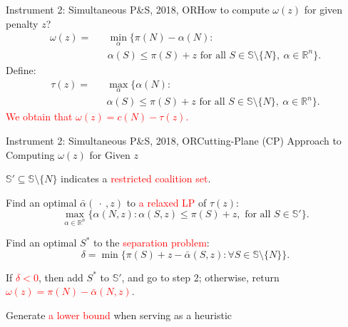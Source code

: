 \documentclass[14pt]{beamer}
\newcommand{\R}{\mathbb{R}}
\begin{document}
\begin{frame}{Instrument 2: Simultaneous P\&S, {\footnotesize 2018, OR}}{How to compute $\omega(z)$ for given penalty $z$?}
\vspace{-30pt}
\small
\begin{eqnarray*}
	\omega(z) = &&\min_{\alpha}\bigg\{ \pi(N) - \alpha(N):\\
	&& \alpha(S) \leq \pi(S)+z \mbox{ for all } S \in \mathbb{S} \setminus \{N\},~\alpha \in \R^n \bigg\}.
\end{eqnarray*}
Define:
\vspace{-10pt}
\begin{eqnarray*}
\tau(z) = && \max_{\alpha} \bigg\{ \alpha(N): \\
&& \alpha(S) \leq \pi(S)+z \mbox{ for all } S \in \mathbb{S} \setminus \{N\},~ \alpha \in \R^n \bigg\}.
\end{eqnarray*}
\textcolor{red}{We obtain that $\omega(z) = c(N)-\tau(z)$.}
\end{frame}



\begin{frame}{Instrument 2: Simultaneous P\&S, {\footnotesize 2018, OR}}{Cutting-Plane (CP) Approach to Computing $\omega(z)$ for Given $z$}
\small
{}
\begin{description}
\justifying
\item[Step 1.] $\mathbb{S}'\subseteq \mathbb{S}\setminus \{N\}$ indicates a \textcolor{red}{restricted coalition set}.
\item[Step 2.] Find an optimal $\bar{\alpha}(\ \cdot \ ,z)$ to \textcolor{red}{a relaxed LP} of $\tau(z)$:
\begin{equation*}
\max_{\alpha\in \R^n} \big\{ \alpha(N,z): \alpha(S,z) \leq \pi(S)+z, \mbox{ for all } S \in \mathbb{S}'\big\}.
\end{equation*} 
\vspace{-11pt}
\item[Step 3.]
Find an optimal $S^*$ to the \textcolor{red}{separation problem}:
\begin{equation*}
\delta = \min \big\{ \pi(S)+z-\bar{\alpha}(S,z): \forall S \in \mathbb{S} \setminus \{N\}\big\}.
\end{equation*}
\item[Step 4.]
If \textcolor{red}{$\delta<0$}, then add $S^*$ to $\mathbb{S}'$, and go to step 2; otherwise, return \textcolor{red}{$\omega(z)=\pi(N)-\bar{\alpha}(N,z)$}. %
\end{description}
\begin{shaded}
\centering
Generate \textcolor{red}{a lower bound} when serving as a heuristic
\end{shaded}
\end{frame}
\end{document}
